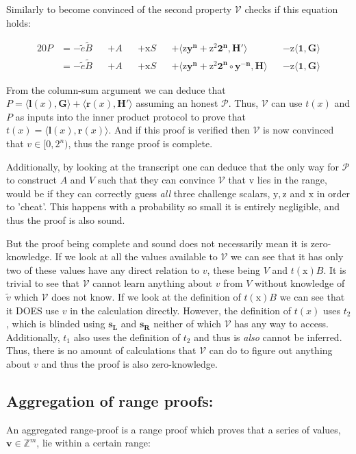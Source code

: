 \documentclass{article}
\newcommand{\eq}[1]{\begin{alignat*}{20}#1\end{alignat*}}
\renewcommand{\vec}[1]{\boldsymbol{#1}}
\newcommand{\ran}[1]{\mathrm{#1}}
\newcommand{\vecran}[1]{\mathbf{#1}}
\newcommand{\V}{\mathcal{V}}
\renewcommand{\P}{\mathcal{P}}
\newcommand{\Z}{\mathbb{Z}}
\newcommand{\dotp}[2]{\langle #1, #2 \rangle}
\newcommand{\blind}[1]{\widetilde{#1}}
\newcommand{\bv}{\blind{v}}
\newcommand{\bB}{\blind{B}}
\newcommand{\be}{\blind{e}}
\begin{document}
Similarly to become convinced of the second property $\V$ checks if
this equation holds:

\eq{
	P &= -\be\bB &&+ A &&+ \ran{x}S &&+ \dotp{\ran{z}\vecran{y}^{\vecran{n}} + \ran{z^2}\vec{2^n}}{\vec{H'}} &&- \ran{z}\dotp{\vec{1}}{\vec{\vec{G}}} \\
	&= -\be\bB &&+ A &&+ \ran{x}S &&+ \dotp{\ran{z}\vecran{y}^{\vecran{n}} + \ran{z^2}\vec{2^n}\circ\vecran{y^{-n}}}{\vec{H}} &&- \ran{z}\dotp{\vec{1}}{\vec{G}}
}

From the column-sum argument we can deduce that $P =
\dotp{\vec{l}(x)}{\vec{G}} + \dotp{\vec{r}(x)}{\vec{H'}}$
assuming an honest $\P$. Thus, $\V$ can use $t(x)$ and $P$ as
inputs into the inner product protocol to prove that $ t(x) =
\dotp{\vec{l}(x)}{\vec{r}(x)}$. And if this proof is verified then
$\V$ is now convinced that $v\in [0,2^n)$, thus the range proof is 
complete.

Additionally, by looking at the transcript one can deduce that the
only way for $\P$ to construct $A$ and $V$ such that they can convince
$\V$ that v lies in the range, would be if they can correctly guess
\textit{all} three challenge scalars, $\ran{y}, \ran{z}$ and $\ran{x}$
in order to 'cheat'. This happens with a probability so small it is
entirely negligible, and thus the proof is also sound.

But the proof being complete and sound does not necessarily mean it is
zero-knowledge. If we look at all the values available to $\V$ we can 
see that it has only two of these values have any direct relation to 
$v$, these being $V$ and $t(\ran{x})B$. It is trivial to see that $\V$ 
cannot learn anything about $v$ from $V$ without knowledge of $\bv$ 
which $\V$ does not know. If we look at the definition of $t(\ran{x})B$ 
we can see that it DOES use $v$ in the calculation directly. However,
the definition of $t(x)$ uses $t_2$, which is blinded using
$\vecran{s_L}$ and $\vecran{s_R}$ neither of which $\V$ has any way
to access. Additionally, $t_1$ also uses the definition of $t_2$ and
thus is \textit{also} cannot be inferred. Thus, there is no amount
of calculations that $\V$ can do to figure out anything about $v$
and thus the proof is also zero-knowledge.

\subsection{Aggregation of range proofs:} \label{aggregation-of-range-proofs}

An aggregated range-proof is a range proof which proves that a series
of values, $\vec{v} \in \Z^m$, lie within a certain range:
\end{document}
